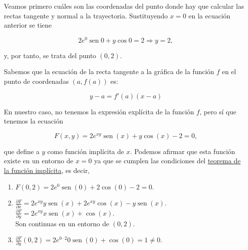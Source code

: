 \documentclass[
  spanish,
  a4paper,
]{scrreport}
\providecommand{\tightlist}{%
  \setlength{\itemsep}{0pt}\setlength{\parskip}{0pt}}
\theoremstyle{definition}
\theoremstyle{remark}
\begin{document}
\begin{tcolorbox}[enhanced jigsaw, arc=.35mm, bottomrule=.15mm, bottomtitle=1mm, breakable, colback=white, colbacktitle=quarto-callout-tip-color!10!white, colframe=quarto-callout-tip-color-frame, coltitle=black, left=2mm, leftrule=.75mm, opacityback=0, opacitybacktitle=0.6, rightrule=.15mm, title=\textcolor{quarto-callout-tip-color}{\faLightbulb}\hspace{0.5em}{Solución}, titlerule=0mm, toprule=.15mm, toptitle=1mm]

Veamos primero cuáles son las coordenadas del punto donde hay que
calcular las rectas tangente y normal a la trayectoria. Sustituyendo
\(x=0\) en la ecuación anterior se tiene

\[
2e^0 \operatorname{sen} 0 + y \cos 0 = 2 \Rightarrow y  = 2,
\]

y, por tanto, se trata del punto \((0,2)\).

Sabemos que la ecuación de la recta tangente a la gráfica de la función
\(f\) en el punto de coordenadas \((a, f(a))\) es:

\[
y-a=f'(a)(x-a)
\]

En nuestro caso, no tenemos la expresión explícita de la función \(f\),
pero sí que tenemos la ecuación

\[
F(x,y) = 2e^{xy} \operatorname{sen}(x) + y\cos(x) -2  = 0,
\]

que define a \(y\) como función implícita de \(x\). Podemos afirmar que
esta función existe en un entorno de \(x=0\) ya que se cumplen las
condiciones del
\href{https://aprendeconalf.es/analisis-manual/13-derivadas-funciones-varias-variables.html\#thm-funcion-implicita}{teorema
de la función implícita}, es decir,

\begin{enumerate}
\def\labelenumi{\alph{enumi}.}
\tightlist
\item
  \(F(0, 2) = 2e^0 \operatorname{sen}(0) + 2 \cos(0) - 2 = 0\).
\item
  \(\frac{\partial F}{\partial x} = 2e^{xy}y \operatorname{sen}(x) + 2e^{xy} \cos(x) - y \operatorname{sen}(x)\).\\
  \(\frac{\partial F}{\partial y} = 2e^{xy}x \operatorname{sen}(x) + \cos(x)\).\\
  Son continuas en un entorno de \((0,2)\).
\item
  \(\frac{\partial F}{\partial y}(0,2) = 2e^{0\cdot 2}0 \operatorname{sen}(0) + \cos(0) = 1\neq 0\).
\end{enumerate}


\end{tcolorbox}
\end{document}
